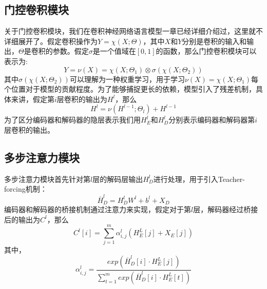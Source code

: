 \documentclass[twoside,a4paper,12pt]{book}%
\begin{document}
\subsection{门控卷积模块}
关于门控卷积模块，我们在卷积神经网络语言模型一章已经详细介绍过，这里就不详细展开了。假定卷积操作为$Y=\chi(X;\Theta)$，其中$X$和$Y$分别是卷积的输入和输出，$\Theta$是卷积的参数。假定$\sigma$是一个值域在$[0,1]$的函数，那么门控卷积模块可以表示为:
$$
Y = \nu(X)=\chi(X;\Theta_1) \otimes \sigma(\chi(X;\Theta_2))
$$
其中$\sigma(\chi(X;\Theta_2))$可以理解为一种权重学习，用于学习$\nu(X)=\chi(X;\Theta_1)$每个位置对于模型的贡献程度。为了能够捕捉更长的依赖，模型引入了残差机制，具体来讲，假定第$i$层卷积的输出为$H^{l}$，那么
$$
H^{l} = \nu(H^{l-1};\Theta_l) + H^{l-1}
$$
为了区分编码器和解码器的隐层表示我们用$H_E^{l}$和$H_D^{l}$分别表示编码器和解码器第$i$层卷积的输出。
\subsection{多步注意力模块}
多步注意力模块首先针对第$l$层的解码层输出$H_D^l$进行处理，用于引入Teacher-forcing机制：
$$
\overline{H}_D^l=H_D^lW^{l} + b^{l}+X_D
$$
编码器和解码器的桥接机制通过注意力来实现，假定对于第$l$层，解码器经过桥接后的输出为$C^{l}$，那么
$$
C^{l}[i]=\sum_{j=1}^{m}{\alpha^{l}_{i,j}(H_E^{L}[j]+X_E[j])}
$$
其中，
$$
\alpha^{l}_{i,j}=\frac{exp(\overline{H}_D^l[i] \cdot H_E^{L}[j])}{\sum_{t=1}^{m}{exp(\overline{H}_D^l[i]\cdot H_E^{L}[t])}}
$$
\end{document}
